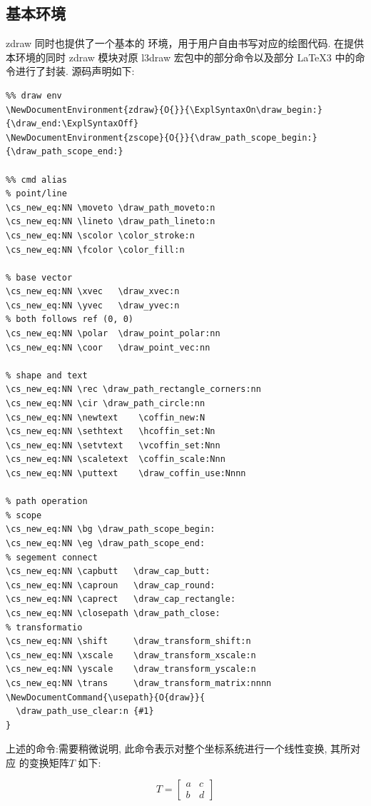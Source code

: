 \documentclass[
  hyper,    
  lang=cn,
  class=book,
  bib_index={load},
  mathSpec={envStyle=leftbar, alias},
  toc={column=2, title=目录},
]{zlatex}
\let\cmd\ztexverb
\begin{document}
\subsection{基本环境}
zdraw 同时也提供了一个基本的 \cmd{zdraw}\index{\cmd{\zplot}} 环境，用于用户自由书写对应的绘图代码. 在提供本环境的同时
zdraw 模块对原 l3draw 宏包中的部分命令以及部分 \LaTeX{}3 中的命令进行了封装. 源码声明如下:
\begin{verbatim} 
%% draw env 
\NewDocumentEnvironment{zdraw}{O{}}{\ExplSyntaxOn\draw_begin:}{\draw_end:\ExplSyntaxOff}
\NewDocumentEnvironment{zscope}{O{}}{\draw_path_scope_begin:}{\draw_path_scope_end:}

%% cmd alias
% point/line
\cs_new_eq:NN \moveto \draw_path_moveto:n
\cs_new_eq:NN \lineto \draw_path_lineto:n
\cs_new_eq:NN \scolor \color_stroke:n
\cs_new_eq:NN \fcolor \color_fill:n

% base vector
\cs_new_eq:NN \xvec   \draw_xvec:n
\cs_new_eq:NN \yvec   \draw_yvec:n
% both follows ref (0, 0)
\cs_new_eq:NN \polar  \draw_point_polar:nn 
\cs_new_eq:NN \coor   \draw_point_vec:nn  

% shape and text
\cs_new_eq:NN \rec \draw_path_rectangle_corners:nn
\cs_new_eq:NN \cir \draw_path_circle:nn
\cs_new_eq:NN \newtext    \coffin_new:N
\cs_new_eq:NN \sethtext   \hcoffin_set:Nn
\cs_new_eq:NN \setvtext   \vcoffin_set:Nnn
\cs_new_eq:NN \scaletext  \coffin_scale:Nnn
\cs_new_eq:NN \puttext    \draw_coffin_use:Nnnn

% path operation
% scope
\cs_new_eq:NN \bg \draw_path_scope_begin:
\cs_new_eq:NN \eg \draw_path_scope_end:
% segement connect
\cs_new_eq:NN \capbutt   \draw_cap_butt:
\cs_new_eq:NN \caproun   \draw_cap_round:
\cs_new_eq:NN \caprect   \draw_cap_rectangle:
\cs_new_eq:NN \closepath \draw_path_close:
% transformatio
\cs_new_eq:NN \shift     \draw_transform_shift:n
\cs_new_eq:NN \xscale    \draw_transform_xscale:n
\cs_new_eq:NN \yscale    \draw_transform_yscale:n
\cs_new_eq:NN \trans     \draw_transform_matrix:nnnn
\NewDocumentCommand{\usepath}{O{draw}}{
  \draw_path_use_clear:n {#1}
}
\end{verbatim}

上述的命令:\cmd{\trans{a}{b}{c}{d}}需要稍微说明, 此命令表示对整个坐标系统进行一个线性变换, 其所对应
的变换矩阵$T$ 如下:

\[
  T = \begin{bmatrix}
    a & c \\
    b & d
  \end{bmatrix}
\]
\end{document}
